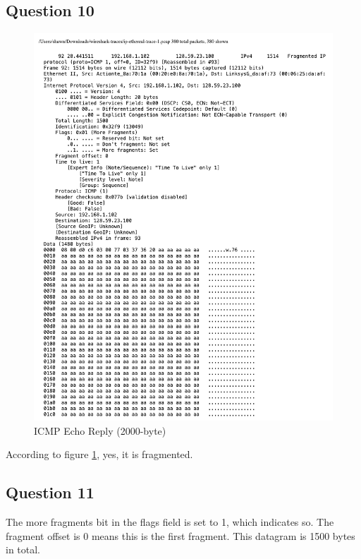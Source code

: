 \documentclass[titlepage, paper=a4, fontsize=11pt]{scrartcl} %
\numberwithin{equation}{section} %
\numberwithin{figure}{section} %
\numberwithin{table}{section} %
\begin{document}
\subsection*{Question 10}
\begin{figure}[!ht]
    \centering
    \includegraphics[width=\textwidth]{images/lab2-q10.pdf}
    \caption{ICMP Echo Reply (2000-byte)}
    \label{fig:ip-icmp2000}
\end{figure}
According to figure \ref{fig:ip-icmp2000}, yes, it is fragmented. \\

\subsection*{Question 11}
The more fragments bit in the flags field is set to 1, which indicates so. The fragment offset is 0 means this is the first fragment. This datagram is 1500 bytes in total. \\
\end{document}
